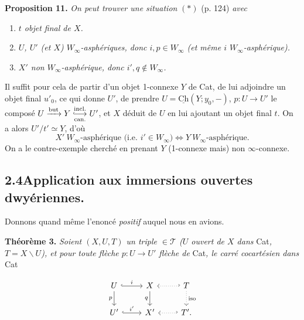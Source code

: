 \documentclass[11pt]{article}
\newcommand{\printedpage}[1]{\marginpar{\footnotesize p.~#1}}
\newcommand{\msp}[1]{\marginpar{\footnotesize [#1]}}
\newcommand{\hra}{\lhook\joinrel\longrightarrow}
\begin{document}
\textbf{Proposition 11.} \textit{On peut trouver une situation} $(*)$ (p. 124) \textit{avec}

\begin{enumerate}[label=\textit{\alph*)}]
\item \textit{$t$ objet final de $X$.}
\item \textit{$U$, $U'$ (et $X$) $W_\infty$-asphériques, donc $i,p\in W_\infty$ (et même $i$ $W_\infty$-asphérique).}
\item \textit{$X'$ non $W_\infty$-asphérique, donc $i',q\notin W_\infty$.}
\end{enumerate}

Il suffit pour cela de partir d'un objet 1-connexe $Y$ de Cat, de lui adjoindre un objet final $u'_0$, ce qui donne $U'$, de prendre $U=\underline{\mathrm{Ch}}(Y;y_0,-)$, $p:U\longrightarrow U'$ le composé $U\xrightarrow{\text{but}}Y\underset{\text{can.}}{\overset{\text{incl.}}{\hra}}U'$, et $X$ déduit de $U$ en lui ajoutant un objet final $t$. On a alors $U'/t'\simeq Y$, d'où
\[ X'\ W_\infty\text{-asphérique (i.e. }i'\in W_\infty)\Longleftrightarrow Y\ W_\infty\text{-asphérique.} \]
On a le contre-exemple cherché en prenant $Y$ (1-connexe mais) non $\infty$-connexe.

\subsection*{2.4\quad Application aux immersions ouvertes dwyériennes.}

Donnons quand même l'enoncé \textit{positif} auquel nous en avions. %

\textbf{Théorème 3.} \textit{Soient $(X,U,T)$ un triple $\in\mathcal{T}$ ($U$ ouvert de $X$ dans} Cat\textit{, $T=X\backslash U$), et pour toute flèche $p:U\longrightarrow U'$ flèche de} Cat\textit{, le carré cocartésien dans} Cat

\[
\begin{tikzcd}
U \arrow[r, hook, "i"] \arrow[d, "p"'] & X \arrow[d, "q"'] & T \arrow[l, dotted, hook'] \arrow[d, dotted, "\text{iso}"] \\
U' \arrow[r, hook, "i'"] & X' & T'. \arrow[l, dotted, hook']
\end{tikzcd}
\]

\printedpage{75}

\msp{page 108}
\end{document}
